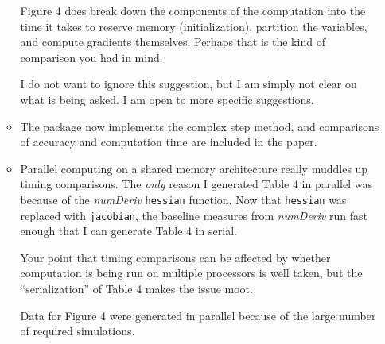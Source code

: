\documentclass{article}
\newcommand{\pkg}[1]{\emph{#1}}
\newcommand{\code}[1]{\texttt{#1}}
\newcommand{\func}[1]{\code{#1}}
\newenvironment{response}{\normalfont}{\vspace{\baselineskip}}
\begin{document}
\begin{enumerate}[align=left]
\begin{response}
\begin{itemize}
  Figure 4 does break down the components of the computation
  into the time it takes to reserve memory (initialization), partition
  the variables, and compute gradients themselves.  Perhaps that is
  the kind of comparison you had in mind.

  I do not want to ignore this suggestion, but I am simply not clear on
  what is being asked.  I am open to more specific suggestions.

\item The package now implements the complex step method, and comparisons of
  accuracy and computation time are included in the paper.

\item Parallel computing on a shared memory architecture really
  muddles up timing comparisons.  The \emph{only} reason I generated
  Table 4 in parallel was because of the \pkg{numDeriv} \func{hessian}
  function. Now that \func{hessian} was replaced with \func{jacobian},
  the baseline measures from \pkg{numDeriv} run fast enough that I can
  generate Table 4 in serial.

Your point that timing comparisons can be affected by
whether computation is being run on multiple processors is well taken, but the
``serialization'' of Table 4 makes the issue moot.

  Data for Figure 4 were generated in parallel because of the large
  number of required simulations.



    \end{itemize}

    
  \end{response}



  


\end{enumerate}
\end{document}
